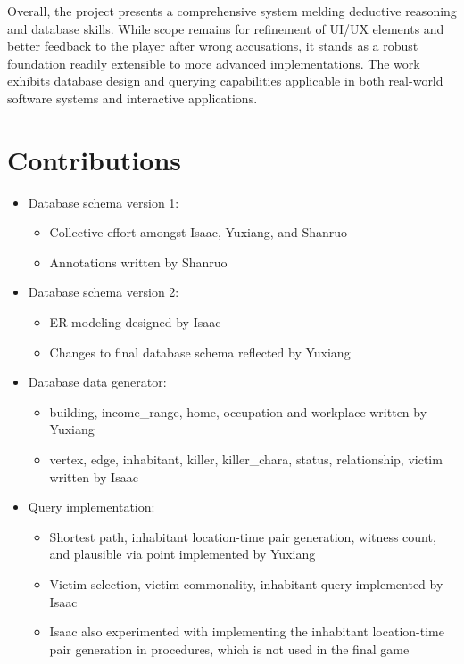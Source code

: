 \documentclass{article}
\begin{document}
Overall, the project presents a comprehensive system melding deductive reasoning and database skills. While scope remains for refinement of UI/UX elements and better feedback to the player after wrong accusations, it stands as a robust foundation readily extensible to more advanced implementations. The work exhibits database design and querying capabilities applicable in both real-world software systems and interactive applications.

\section{Contributions}
\begin{itemize}
    \item Database schema version 1:
    \begin{itemize}
        \item Collective effort amongst Isaac, Yuxiang, and Shanruo
        \item Annotations written by Shanruo
    \end{itemize}
    \item Database schema version 2:
    \begin{itemize}
        \item ER modeling designed by Isaac
        \item Changes to final database schema reflected by Yuxiang
    \end{itemize}
    \item Database data generator:
    \begin{itemize}
        \item building, income\_range, home, occupation and workplace written by Yuxiang
        \item vertex, edge, inhabitant, killer, killer\_chara, status, relationship, victim written by Isaac
    \end{itemize}
    \item Query implementation:
    \begin{itemize}
        \item Shortest path, inhabitant location-time pair generation, witness count, and plausible via point implemented by Yuxiang
        \item Victim selection, victim commonality, inhabitant query implemented by Isaac
        \item Isaac also experimented with implementing the inhabitant location-time pair generation in procedures, which is not used in the final game
    \end{itemize}

\end{itemize}
\end{document}
